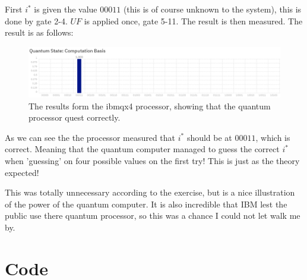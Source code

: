 \documentclass[a4paper,norsk, 10pt]{article}
\begin{document}
First $i^*$ is given the value $00011$ (this is of course unknown to the system), this is done by gate 2-4. $UF$ is applied once, gate 5-11. The result is then measured. The result is as follows:

\begin{figure}[H]
\centering
\includegraphics[scale=0.4]{IBMresultat.png}
\caption{The results form the ibmqx4 processor, showing that the quantum processor quest correctly.}
\end{figure}

As we can see the the processor measured that $i^*$ should be at $00011$, which is correct. Meaning that the quantum computer managed to guess the correct $i^*$ when 'guessing' on four possible values on the first try!  This is just as the theory expected!

This was totally unnecessary according to the exercise, but is a nice illustration of the power of the quantum computer. It is also incredible that IBM lest the public use there quantum processor, so this was a chance I could not let walk me by.
\section{Code}\label{sec:code}

\end{document}
